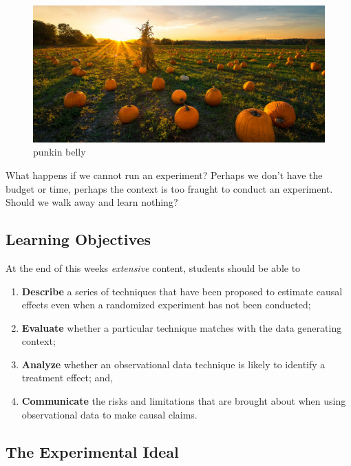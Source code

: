\documentclass[
]{article}
\providecommand{\tightlist}{%
  \setlength{\itemsep}{0pt}\setlength{\parskip}{0pt}}
\begin{document}
\begin{figure}
\centering
\includegraphics{./images/punkin.jpeg}
\caption{punkin belly}
\end{figure}

What happens if we cannot run an experiment? Perhaps we don't have the budget or time, perhaps the context is too fraught to conduct an experiment. Should we walk away and learn nothing?

\hypertarget{learning-objectives-9}{%
\subsection{Learning Objectives}\label{learning-objectives-9}}

At the end of this weeks \emph{extensive} content, students should be able to

\begin{enumerate}
\def\labelenumi{\arabic{enumi}.}
\tightlist
\item
  \textbf{Describe} a series of techniques that have been proposed to estimate causal effects even when a randomized experiment has not been conducted;
\item
  \textbf{Evaluate} whether a particular technique matches with the data generating context;
\item
  \textbf{Analyze} whether an observational data technique is likely to identify a treatment effect; and,
\item
  \textbf{Communicate} the risks and limitations that are brought about when using observational data to make causal claims.
\end{enumerate}

\hypertarget{the-experimental-ideal}{%
\subsection{The Experimental Ideal}\label{the-experimental-ideal}}
\end{document}
